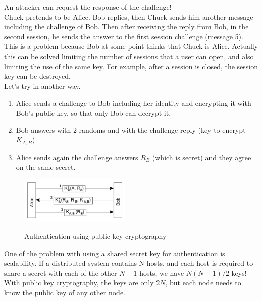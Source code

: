 \documentclass[10pt,a4paper]{article}
\begin{document}
An attacker can request the response of the challenge! \\
Chuck pretends to be Alice. Bob replies, then Chuck sends him another message including the challenge of Bob. Then after receiving the reply  from Bob, in the second session, he sends the answer to the first session challenge (message 5). This is a problem because Bob at some point thinks that Chuck is Alice. Actually this can be solved limiting the number of sessions that a user can open, and also limiting the use of the same key. For example, after a session is closed, the session key can be destroyed. \\ Let's try in another way.
\begin{enumerate}
	\item Alice sends a challenge to Bob including her identity and encrypting it with Bob's public key, so that only Bob can decrypt it.
	\item Bob answers with 2 randoms and with the challenge reply (key to encrypt $K_{A,B}$)
	\item Alice sends again the challenge answers $R_B$ (which is secret) and they agree on the same secret.
\end{enumerate}
\begin{figure}[h!]\hfill \includegraphics[width=150pt]{images/public-key.png}\hspace*{\fill}
  \label{fig:public-key}
  \caption{Authentication using public-key cryptography}
\end{figure}
One of the problem with using a shared secret key for authentication is scalability. If a distributed system contains N hosts, and each host is required to share a secret with each of the other $N-1$ hosts, we have $N(N-1)/2$ keys! With public key cryptography, the keys are only $2N$, but each node needs to know the public key of any other node. \\
\end{document}
